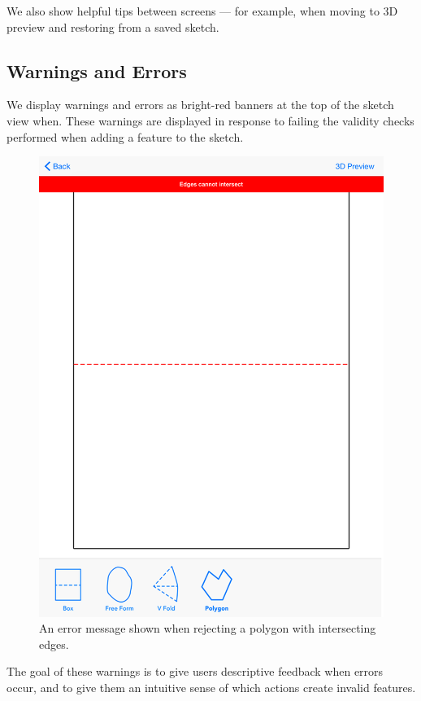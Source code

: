 We also show helpful tips between screens --- for example, when moving
to 3D preview and restoring from a saved sketch.

\subsection{Warnings and Errors}\label{warnings-and-errors}

We display warnings and errors as bright-red banners at the top of the
sketch view when. These warnings are displayed in response to failing
the validity checks performed when adding a feature to the sketch.

\begin{figure}[htbp]
\centering
\includegraphics{figures/32_UI_Tool_Interactions/error_message.png}
\caption{An error message shown when rejecting a polygon with
intersecting edges.}
\end{figure}

The goal of these warnings is to give users descriptive feedback when
errors occur, and to give them an intuitive sense of which actions
create invalid features.

